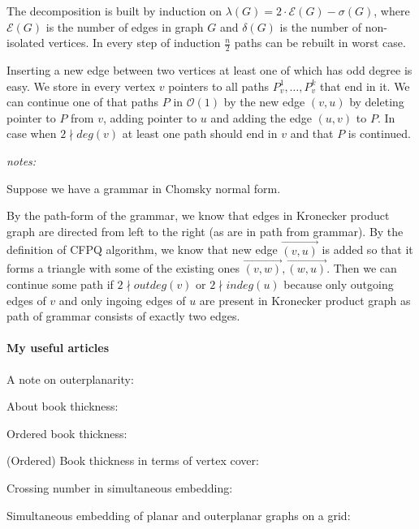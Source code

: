 The decomposition is built by induction on $\lambda(G) = 2 \cdot \mathcal{E}(G) - \sigma(G)$, where $\mathcal{E}(G)$ is the number of edges in graph $G$ and $\delta(G)$ is the number of non-isolated vertices. In every step of induction $\frac{n}{2}$ paths can be rebuilt in worst case. 


Inserting a new edge between two vertices at least one of which has odd degree is easy. We store in every vertex $v$ pointers to all paths $P_v^1, \ldots, P_v^k$ that end in it. We can continue one of that paths $P$ in $\mathcal{O}(1)$ by the new edge $(v, u)$ by deleting pointer to $P$ from $v$, adding pointer to $u$ and adding the edge $(u, v)$ to $P$. In case when $2 \nmid deg(v)$ at least one path should end in $v$ and that $P$ is continued.


\textit{notes:}

Suppose we have a grammar in Chomsky normal form.

By the path-form of the grammar, we know that edges in Kronecker product graph are directed from left to the right (as are in path from grammar). By the definition of CFPQ algorithm, we know that new edge $\overrightarrow{(v, u)}$ is added so that it forms a triangle with some of the existing ones $\overrightarrow{(v, w)},\overrightarrow{(w, u)}$. Then we can continue some path if $2 \nmid outdeg(v)$ or $2 \nmid indeg(u)$ because only outgoing edges of $v$ and only ingoing edges of $u$ are present in Kronecker product graph as path of grammar consists of exactly two edges.


\paragraph{My useful articles}

A note on outerplanarity:~\cite{jha1993note}

About book thickness:~\cite{bernhart1979book}

Ordered book thickness:~\cite{10.1007/978-3-030-59267-7_35}

(Ordered) Book thickness in terms of vertex cover:~\cite{bhore2019parameterized}

Crossing number in simultaneous embedding:~\cite{crossing2009}

Simultaneous embedding of planar and outerplanar graphs on a grid:~\cite{brass2007simultaneous}


